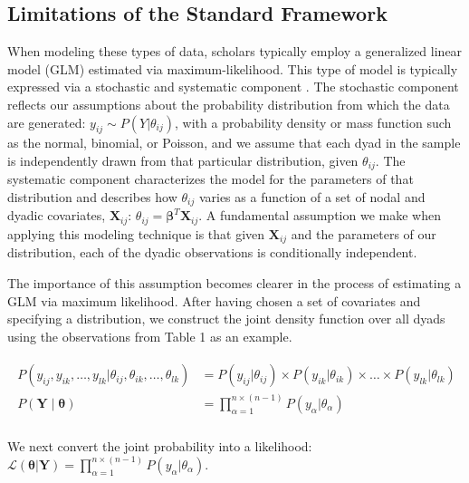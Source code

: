 \documentclass[12pt,pdflatex]{elsarticle}
\begin{document}
\subsection{Limitations of the Standard Framework}

When modeling these types of data, scholars typically employ a generalized linear model (GLM) estimated via maximum-likelihood. This type of model is typically expressed via a stochastic and systematic component \citep{pawitan:2013}. The stochastic component reflects our assumptions about the probability distribution from which the data are generated: $y_{ij} \sim P(Y | \theta_{ij})$, with a probability density or mass function such as the normal, binomial, or Poisson, and we assume that each dyad in the sample is independently drawn from that particular distribution, given $\theta_{ij}$. The systematic component characterizes the model for the parameters of that distribution and describes how $\theta_{ij}$ varies as a function of a set of nodal and dyadic covariates, $\mathbf{X}_{ij}$: $\theta_{ij} = \bm\beta^{T} \mathbf{X}_{ij}$. A fundamental assumption we make when applying this modeling technique is that given $\mathbf{X}_{ij}$ and the parameters of our distribution, each of the dyadic observations is conditionally independent. 

The importance of this assumption becomes clearer in the process of estimating a GLM via maximum likelihood. After having chosen a set of covariates and specifying a distribution, we construct the joint density function over all dyads using the observations from Table 1 as an example.

\vspace{-8mm}
\begin{align}
\begin{aligned}
	P(y_{ij}, y_{ik}, \ldots, y_{lk} | \theta_{ij}, \theta_{ik}, \ldots, \theta_{lk}) &= P(y_{ij} | \theta_{ij}) \times P(y_{ik} | \theta_{ik}) \times \ldots \times P(y_{lk} | \theta_{lk}) \\
	P(\mathbf{Y} \; | \; \bm{\theta}) &= \prod_{\alpha=1}^{n \times (n-1)} P(y_{\alpha} | \theta_{\alpha})  \\
\end{aligned}
\end{align}

\noindent We next convert the joint probability into a likelihood: $\displaystyle \mathcal{L} (\bm{\theta} | \mathbf{Y}) = \prod_{\alpha=1}^{n \times (n-1)} P(y_{\alpha} | \theta_{\alpha})$.
\end{document}
